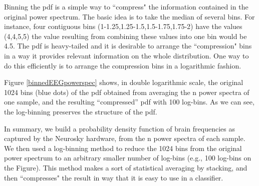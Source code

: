 Binning the pdf is a simple way to ``compress" the information contained in the original power spectrum. The basic idea is to take the median of several bins. For instance, four contiguous bins (1-1.25,1.25-1.5,1.5-1.75,1.75-2) have the values (4,4,5,5) the value resulting from combining these values into one bin would be 4.5. The pdf is heavy-tailed and it is desirable to arrange the ``compression" bins in a way it provides relevant information on the whole distribution. One way to do this efficiently is to arrange the compression bins in a logarithmic fashion.




Figure \ref{binnedEEGpowerspec} shows, in double logarithmic scale, the original 1024 bins (blue dots) of the pdf obtained from averaging the n power spectra of one sample, and the resulting ``compressed''  pdf with 100 log-bins. As we can see, the log-binning preserves the structure of the pdf.

In summary, we build a probability density function of brain frequencies as captured by the Neurosky hardware, from the n power spectra of each sample. We then used a log-binning method to reduce the 1024 bins from the original power spectrum to an arbitrary smaller number of log-bins (e.g., 100 log-bins on the Figure). This method makes a sort of statistical averaging by stacking, and then ``compresses" the result in way that it is easy to use in a classifier.


